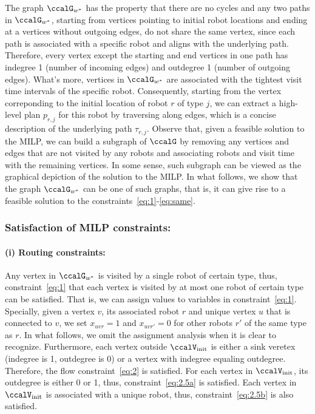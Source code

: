 \documentclass[Afour,sageh,times]{sagej}
\begin{document}
{The graph $\ccalG_{w^*}$ has the property that there are no cycles and any two paths in $\ccalG_{w^*}$, starting from vertices pointing to initial robot locations  and ending at a vertices without outgoing edges, do not share the same vertex, since each path is associated with a specific robot and aligns with the underlying path. Therefore, every vertex except the starting and end vertices in one path has indegree 1 (number of incoming edges) and outdegree 1 (number of outgoing edges). What's more, vertices in $\ccalG_{w^*}$ are associated with the tightest visit time intervals of the specific robot. Consequently, starting from the vertex correponding to the initial location of robot $r$ of type $j$, we can extract a high-level plan $p_{r,j}$ for this robot by traversing along edges, which is a concise description of the underlying path $\tau_{r,j}$. Observe that, given a feasible solution to the MILP, we can build a subgraph of $\ccalG$ by removing any vertices and edges that are not visited by any robots and associating robots and visit time with the remaining vertices. In some sense, such subgraph can be viewed as the graphical depiction of the solution to the MILP. In what follows, we show that the graph $\ccalG_{w^*}$ can be one of such graphs, that is, it can give rise to a feasible solution to the constraints~\eqref{eq:1}-\eqref{eq:same}.

\subsubsection{Satisfaction of MILP constraints:}\label{app:milp}
\paragraph{(i) Routing constraints:} Any vertex in $\ccalG_{w^*}$ is visited by a single robot of certain type, thus, constraint~\eqref{eq:1} that each vertex is visited by at most one robot of certain type can be  satisfied. That is, we can assign values to variables in constraint~\eqref{eq:1}. Specially, given a vertex $v$, its associated robot $r$ and unique vertex $u$ that is connected to $v$, we set $x_{uvr}=1$  and $x_{uvr'}=0$ for other robots $r'$ of the same type as $r$. In what follows, we omit the assignment analysis when it is clear to recognize. Furthermore, each vertex outside $\ccalV_{\text{init}}$  is either a sink veretex (indegree is 1, outdegree is 0) or a vertex with indegree equaling outdegree. Therefore, the flow constraint~\eqref{eq:2} is satisfied. For each vertex in $\ccalV_\text{init}$, its outdegree is either 0 or 1, thus, constraint~\eqref{eq:2.5a} is satisfied. Each vertex in $\ccalV_\text{init}$ is associated with a unique robot, thus, constraint~\eqref{eq:2.5b} is also satisfied.
}
\end{document}
